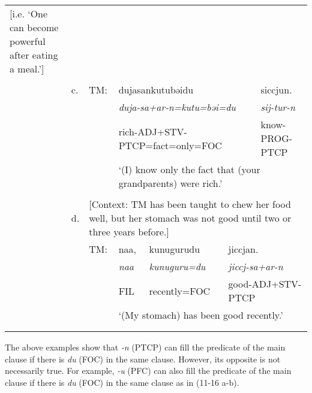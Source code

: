 \begin{tabularx}{\textwidth}{XXXXXXXXXXX}
{{ [i.e. ‘One can become powerful after eating a meal.’]}}\\
&  &  & \multicolumn{8}{X}{\raggedleft [Co: 120415\_01.txt]}\\
& { c.} & { TM:} & \multicolumn{7}{X}{{ dujasankutubəidu}} & { siccjun.}\\
&  &  & \multicolumn{7}{X}{{ \textit{duja-sa+ar-n=kutu=bəi=du}}} & { \textit{sij-tur-n}}\\
&  &  & \multicolumn{7}{X}{{ rich-ADJ+STV-PTCP=fact=only=FOC}} & { know-PROG-PTCP}\\
&  &  & \multicolumn{8}{X}{{ ‘(I) know only the fact that (your grandparents) were rich.’}}\\
&  & \multicolumn{9}{X}{\raggedleft [Co: 120415\_01.txt]}\\
& { d.} & \multicolumn{9}{X}{{ [Context: TM has been taught to chew her food well, but her stomach was not good until two or three years before.]}}\\
&  & { TM:} & { naa,} & \multicolumn{3}{X}{{ kunugurudu}} & \multicolumn{4}{X}{{ jiccjan.}}\\
&  &  & {\itshape naa} & \multicolumn{3}{X}{{ \textit{kunuguru=du}}} & \multicolumn{4}{X}{{ \textit{jiccj-sa+ar-n}}}\\
&  &  & { FIL} & \multicolumn{3}{X}{{ recently=FOC}} & \multicolumn{4}{X}{{ good-ADJ+STV-PTCP}}\\
&  &  & \multicolumn{8}{X}{{ ‘(My stomach) has been good recently.’}}\\
&  & \multicolumn{9}{X}{\raggedleft [Co: 120415\_01.txt]}\\
\lspbottomrule
\end{tabularx}
The above examples show that \textit{-n} (PTCP) can fill the predicate of the main clause if there is \textit{du} (FOC) in the same clause. However, its opposite is not necessarily true. For example, \textit{{}-u} (PFC) can also fill the predicate of the main clause if there is \textit{du} (FOC) in the same clause as in (11-16 a-b).

\tablefirsthead{}

